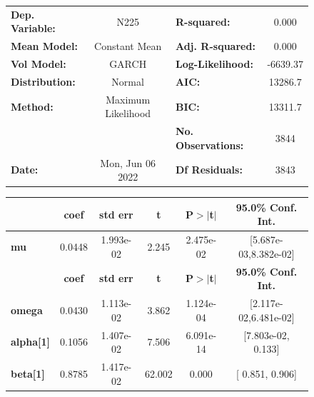 \documentclass[a4paper, oneside]{discothesis}
\begin{document}
\begin{figure}
\begin{multicols}{2}
{  
\begin{center}
\begin{tabular}{lclc}
\toprule
\textbf{Dep. Variable:} &        N225        & \textbf{  R-squared:         } &     0.000   \\
\textbf{Mean Model:}    &   Constant Mean    & \textbf{  Adj. R-squared:    } &     0.000   \\
\textbf{Vol Model:}     &       GARCH        & \textbf{  Log-Likelihood:    } &   -6639.37  \\
\textbf{Distribution:}  &       Normal       & \textbf{  AIC:               } &    13286.7  \\
\textbf{Method:}        & Maximum Likelihood & \textbf{  BIC:               } &    13311.7  \\
\textbf{}               &                    & \textbf{  No. Observations:  } &    3844     \\
\textbf{Date:}          &  Mon, Jun 06 2022  & \textbf{  Df Residuals:      } &    3843     \\
\bottomrule
\end{tabular}
\begin{tabular}{lccccc}
            & \textbf{coef} & \textbf{std err} & \textbf{t} & \textbf{P$> |$t$|$} & \textbf{95.0\% Conf. Int.}  \\
\midrule
\textbf{mu} &       0.0448  &    1.993e-02     &     2.245  &      2.475e-02       &   [5.687e-03,8.382e-02]     \\
                  & \textbf{coef} & \textbf{std err} & \textbf{t} & \textbf{P$> |$t$|$} & \textbf{95.0\% Conf. Int.}  \\
\midrule
\textbf{omega}    &       0.0430  &    1.113e-02     &     3.862  &      1.124e-04       &   [2.117e-02,6.481e-02]     \\
\textbf{alpha[1]} &       0.1056  &    1.407e-02     &     7.506  &      6.091e-14       &    [7.803e-02,  0.133]      \\
\textbf{beta[1]}  &       0.8785  &    1.417e-02     &    62.002  &        0.000         &     [  0.851,  0.906]       \\
\bottomrule
\end{tabular}
\end{center}

}
\end{multicols}
\end{figure}
\end{document}
